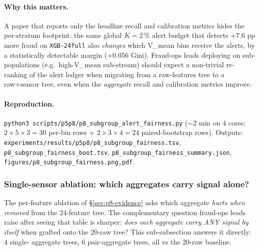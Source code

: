\paragraph{Why this matters.}
A paper that reports only the headline recall and calibration metrics
hides the per-stratum footprint: the same global $K{=}2\,\%$ alert
budget that detects $+7.6$ pp more fraud on \texttt{XGB-24full} also
\emph{changes} which V\_mean bins receive the alerts, by a
statistically detectable margin ($+0.056$ Gini). Fraud-ops leads
deploying on sub-populations (e.g.\ high-V\_mean sub-stream) should
expect a non-trivial re-ranking of the alert ledger when migrating
from a raw-features tree to a raw+sensor tree, even when the
\emph{aggregate} recall and calibration metrics improve.

\paragraph{Reproduction.}
\texttt{python3 scripts/p5p8/p8\_subgroup\_alert\_fairness.py}
($\sim$2 min on 4 cores; $2 \times 5 \times 3 = 30$ per-bin rows +
$2 \times 3 \times 4 = 24$ paired-bootstrap rows). Outputs:
\texttt{experiments/results/p5p8/p8\_subgroup\_fairness.tsv},
\texttt{p8\_subgroup\_fairness\_boot.tsv},
\texttt{p8\_subgroup\_fairness\_summary.json},
\texttt{figures/p8\_subgroup\_fairness.{png,pdf}}.

\subsubsection{Single-sensor ablation: which aggregates carry signal alone?}
\label{sec:p8-single-sensor}

The per-feature ablation of \S\ref{sec:p8-evidence} asks which aggregate
\emph{hurts when removed} from the 24-feature tree. The complementary
question fraud-ops leads raise after seeing that table is sharper:
\emph{does each aggregate carry ANY signal by itself} when grafted onto
the 20-raw tree? This sub-subsection answers it directly: $4$ single-
aggregate trees, $6$ pair-aggregate trees, all vs the 20-raw baseline.

